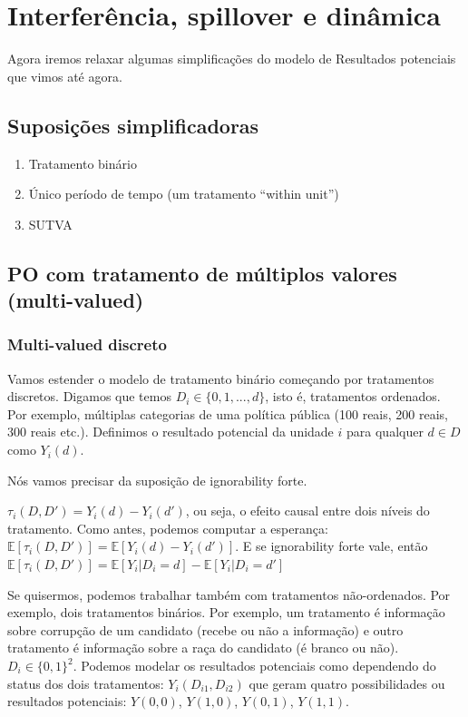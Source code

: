 \documentclass[
]{article}
\providecommand{\tightlist}{%
  \setlength{\itemsep}{0pt}\setlength{\parskip}{0pt}}
\begin{document}
\section{Interferência, spillover e dinâmica}\label{interferuxeancia-spillover-e-dinuxe2mica}

Agora iremos relaxar algumas simplificações do modelo de Resultados potenciais que vimos até agora.

\subsection{Suposições simplificadoras}\label{suposiuxe7uxf5es-simplificadoras}

\begin{enumerate}
\def\labelenumi{\arabic{enumi}.}
\tightlist
\item
  Tratamento binário
\item
  Único período de tempo (um tratamento ``within unit'')
\item
  SUTVA
\end{enumerate}

\subsection{PO com tratamento de múltiplos valores (multi-valued)}\label{po-com-tratamento-de-muxfaltiplos-valores-multi-valued}

\subsubsection{Multi-valued discreto}\label{multi-valued-discreto}

Vamos estender o modelo de tratamento binário começando por tratamentos discretos. Digamos que temos \(D_i \in \{0, 1, ..., d\}\), isto é, tratamentos ordenados. Por exemplo, múltiplas categorias de uma política pública (100 reais, 200 reais, 300 reais etc.). Definimos o resultado potencial da unidade \(i\) para qualquer \(d \in D\) como \(Y_i(d)\).

Nós vamos precisar da suposição de ignorability forte.

\(\tau_i(D, D') = Y_i(d) - Y_i(d')\), ou seja, o efeito causal entre dois níveis do tratamento. Como antes, podemos computar a esperança: \(\mathbb{E}[\tau_i(D, D')] = \mathbb{E}[Y_i(d) - Y_i(d')]\). E se ignorability forte vale, então \(\mathbb{E}[\tau_i(D, D')] = \mathbb{E}[Y_i|D_i = d] - \mathbb{E}[Y_i|D_i = d']\)

Se quisermos, podemos trabalhar também com tratamentos não-ordenados. Por exemplo, dois tratamentos binários. Por exemplo, um tratamento é informação sobre corrupção de um candidato (recebe ou não a informação) e outro tratamento é informação sobre a raça do candidato (é branco ou não). \(D_i \in \{0,1\}^2\). Podemos modelar os resultados potenciais como dependendo do status dos dois tratamentos: \(Y_i(D_{i1}, D_{i2})\) que geram quatro possibilidades ou resultados potenciais: \(Y(0,0)\), \(Y(1,0)\), \(Y(0,1)\), \(Y(1,1)\).
\end{document}
